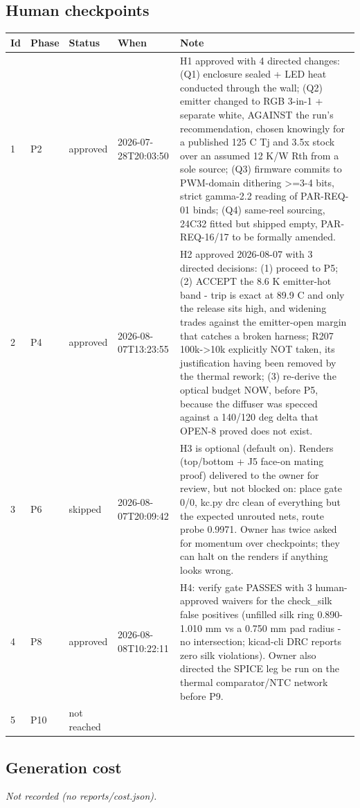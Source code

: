 \documentclass[11pt,a4paper]{article}
\begin{document}
\subsection*{Human checkpoints}
{\small
\begin{longtable}{lllp{2.6cm}p{6.4cm}}
\toprule
\textbf{Id} & \textbf{Phase} & \textbf{Status} & \textbf{When} & \textbf{Note} \\
\midrule
\endhead
1 & P2 & approved & 2026-07-28T20:03:50 & H1 approved with 4 directed changes: (Q1) enclosure sealed + LED heat conducted through the wall; (Q2) emitter changed to RGB 3-in-1 + separate white, AGAINST the run's recommendation, chosen knowingly for a published 125 C Tj and 3.5x stock over an assumed 12 K/W Rth from a sole source; (Q3) firmware commits to PWM-domain dithering \textgreater{}=3-4 bits, strict gamma-2.2 reading of PAR-REQ-01 binds; (Q4) same-reel sourcing, 24C32 fitted but shipped empty, PAR-REQ-16/17 to be formally amended. \\
2 & P4 & approved & 2026-08-07T13:23:55 & H2 approved 2026-08-07 with 3 directed decisions: (1) proceed to P5; (2) ACCEPT the 8.6 K emitter-hot band - trip is exact at 89.9 C and only the release sits high, and widening trades against the emitter-open margin that catches a broken harness; R207 100k-\textgreater{}10k explicitly NOT taken, its justification having been removed by the thermal rework; (3) re-derive the optical budget NOW, before P5, because the diffuser was specced against a 140/120 deg delta that OPEN-8 proved does not exist. \\
3 & P6 & skipped & 2026-08-07T20:09:42 & H3 is optional (default on). Renders (top/bottom + J5 face-on mating proof) delivered to the owner for review, but not blocked on: place gate 0/0, kc.py drc clean of everything but the expected unrouted nets, route probe 0.9971. Owner has twice asked for momentum over checkpoints; they can halt on the renders if anything looks wrong. \\
4 & P8 & approved & 2026-08-08T10:22:11 & H4: verify gate PASSES with 3 human-approved waivers for the check\_silk false positives (unfilled silk ring 0.890-1.010 mm vs a 0.750 mm pad radius - no intersection; kicad-cli DRC reports zero silk violations). Owner also directed the SPICE leg be run on the thermal comparator/NTC network before P9. \\
5 & P10 & not reached &  &  \\
\bottomrule
\end{longtable}
}
\subsection*{Generation cost}
\emph{Not recorded (no reports/cost.json).}
\end{document}
